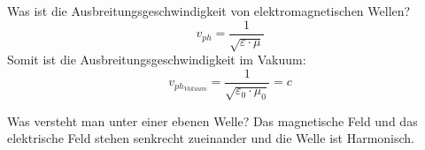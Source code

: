 \begin{karte}{Was ist die Ausbreitungsgeschwindigkeit von elektromagnetischen Wellen?}
	\Large
	\begin{equation*}
		v_{ph} = \frac{1}{\sqrt{\varepsilon \cdot \mu}}
	\end{equation*}	
	 \normalsize
	Somit ist die Ausbreitungsgeschwindigkeit im Vakuum:
	\begin{equation*}
		v_{ph_{Vakuum}} = \frac{1}{\sqrt{\varepsilon_0 \cdot \mu_0}} = c
	\end{equation*}
	
\end{karte}

\begin{karte}{Was versteht man unter einer ebenen Welle?}
	Das magnetische Feld und das elektrische Feld stehen senkrecht zueinander und die Welle ist Harmonisch.\\
\end{karte}
